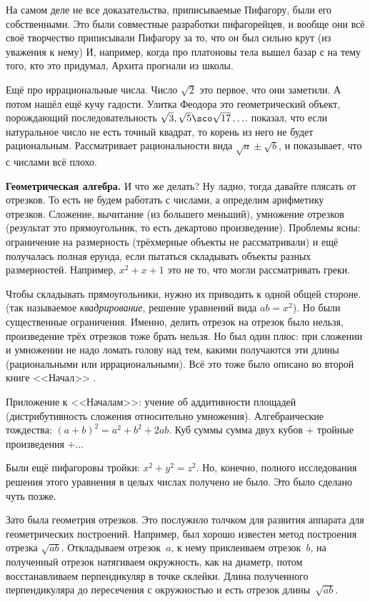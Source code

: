 \documentclass[a4paper,oneside,fleqn,10pt]{article}
\begin{document}
На самом деле не все доказательства, приписываемые Пифагору, были его
собственными.  Это были совместные разработки пифагорейцев, и вообще
они всё своё творчество приписывали Пифагору за то, что он был сильно
крут (из уважения к нему) И, например, когда про платоновы тела вышел
базар с  на тему того, кто это придумал, Архита
прогнали из школы.

Ещё про иррациональные числа. Число $\sqrt2$ это первое, что они
заметили.  А потом  нашёл ещё кучу гадости. Улитка
Феодора это геометрический объект, порождающий последовательность
$\sqrt3, \sqrt5\sco\sqrt{17}\ldots$.   показал, что если
натуральное число не есть точный квадрат, то корень из него не будет
рациональным.  Рассматривает рациональности вида $\sqrt a \pm \sqrt
b$, и показывает, что с числами всё плохо.

\textbf{Геометрическая алгебра.}  И что же делать? Ну ладно, тогда
давайте плясать от отрезков. То есть не будем работать с числами, а
определим арифметику отрезков.  Сложение, вычитание (из большего
меньший), умножение отрезков (результат это прямоугольник, то есть
декартово произведение). Проблемы ясны: ограничение на размерность
(трёхмерные объекты не рассматривали) и ещё получалась полная ерунда,
если пытаться складывать объекты разных размерностей. Например, $x^2 +
x + 1$ это не то, что могли рассматривать греки.

Чтобы складывать прямоугольники, нужно их приводить к одной общей
стороне.  (так называемое \emph{квадрирование}, решение уравнений вида
$ab = x^2$). Но были существенные ограничения.  Именно, делить отрезок
на отрезок было нельзя, произведение трёх отрезков тоже брать нельзя.
Но был один плюс: при сложении и умножении не надо ломать голову над
тем, какими получаются эти длины (рациональными или иррациональными).
Всё это тоже было описано во второй книге <<Начал>>
.

Приложение к <<Началам>>: учение об аддитивности площадей
(дистрибутивность сложения относительно умножения).  Алгебраические
тождества: $(a+b)^2 = a^2 + b^2 + 2ab$. Куб суммы сумма двух кубов $+$
тройные произведения $+\ldots$

Были ещё пифагоровы тройки: $x^2 + y^2 = z^2$.  Но, конечно, полного
исследования решения этого уравнения в целых числах получено не было.
Это было сделано чуть позже.

Зато была геометрия отрезков. Это послужило толчком для развития
аппарата для геометрических построений.  Например, был хорошо известен
метод построения отрезка $\sqrt{ab}$. Откладываем отрезок~$a$, к нему
приклеиваем отрезок~$b$, на полученный отрезок натягиваем окружность,
как на диаметр, потом восстанавливаем перпендикуляр в точке
склейки. Длина полученного перпендикуляра до пересечения с окружностью
и есть отрезок длины~$\sqrt{ab}$.
\end{document}
